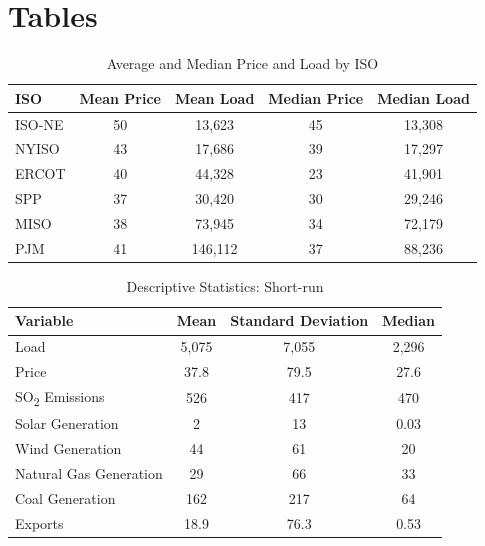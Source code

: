 \documentclass[12pt]{article}
\begin{document}
\singlespacing
\setlength\bibsep{0pt}
\printbibliography




\clearpage

\onehalfspacing

\section*{Tables} \label{sec:tab}

\begin{table}[htbp]
\centering
\begin{tabular}{lcccc}
\toprule
\textbf{ISO} & \textbf{Mean Price} & \textbf{Mean Load} & \textbf{Median Price} & \textbf{Median Load} \\
\midrule
ISO-NE & 50 & 13{,}623 & 45 & 13{,}308 \\
NYISO  & 43 & 17{,}686 & 39 & 17{,}297 \\
ERCOT  & 40 & 44{,}328 & 23 & 41{,}901 \\
SPP    & 37 & 30{,}420 & 30 & 29{,}246 \\
MISO   & 38 & 73{,}945 & 34 & 72{,}179 \\
PJM    & 41 & 146{,}112 & 37 & 88{,}236 \\
\bottomrule
\end{tabular}
\caption{Average and Median Price and Load by ISO}
\label{priceData}
\end{table}

\begin{table}[htbp]
\centering
\begin{tabular}{lccc}
\toprule
\textbf{Variable} & \textbf{Mean} & \textbf{Standard Deviation} & \textbf{Median} \\
\midrule
Load & 5{,}075 & 7{,}055 & 2{,}296 \\
Price & 37.8 & 79.5 & 27.6 \\
SO\textsubscript{2} Emissions & 526 & 417 & 470 \\
Solar Generation & 2 & 13 & 0.03 \\
Wind Generation & 44 & 61 & 20 \\
Natural Gas Generation & 29 & 66 & 33 \\
Coal Generation & 162 & 217 & 64 \\
Exports & 18.9 & 76.3 & 0.53 \\
\bottomrule
\end{tabular}
\caption{Descriptive Statistics: Short-run}
\label{ShortTermStats1}
\end{table}
\end{document}
